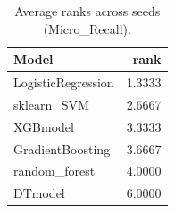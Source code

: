 \begin{table}[t]
\centering
\begin{tabular}{lr}
\toprule
Model & rank \\
\midrule
LogisticRegression & 1.3333 \\
sklearn_SVM & 2.6667 \\
XGBmodel & 3.3333 \\
GradientBoosting & 3.6667 \\
random_forest & 4.0000 \\
DTmodel & 6.0000 \\
\bottomrule
\end{tabular}
\caption{Average ranks across seeds (Micro_Recall).}
\label{tab:avg_rank_Micro_Recall}
\end{table}